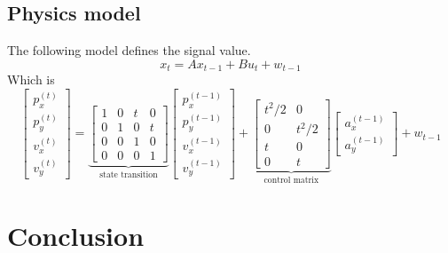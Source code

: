 \documentclass[12pt]{article}
\begin{document}
	\subsection{Physics model}\label{sub:model}
	The following model defines the signal value.
	\begin{equation}
		x_t=Ax_{t-1}+Bu_t+w_{t-1}
	\end{equation}
	Which is
	\begin{equation}
		\begin{bmatrix}
			p^{(t)}_x \\ p^{(t)}_y \\ v^{(t)}_x \\ v^{(t)}_y
		\end{bmatrix}=
		\underbrace{\begin{bmatrix}
			1 & 0 & t & 0 \\
			0 & 1 & 0 & t \\
			0 & 0 & 1 & 0 \\
			0 & 0 & 0 & 1
		\end{bmatrix}}_{\text{state transition}}
		\begin{bmatrix}
			p^{(t-1)}_x \\ p^{(t-1)}_y \\ v^{(t-1)}_x \\ v^{(t-1)}_y
		\end{bmatrix}+
		\underbrace{\begin{bmatrix}
			t^2/2 & 0 \\
			0 & t^2/2 \\
			t & 0 \\
			0 & t
		\end{bmatrix}}_{\text{control matrix}}
		\begin{bmatrix}
			a^{(t-1)}_x \\ a^{(t-1)}_y
		\end{bmatrix}+w_{t-1}
	\end{equation}



	\section{Conclusion}
\end{document}
